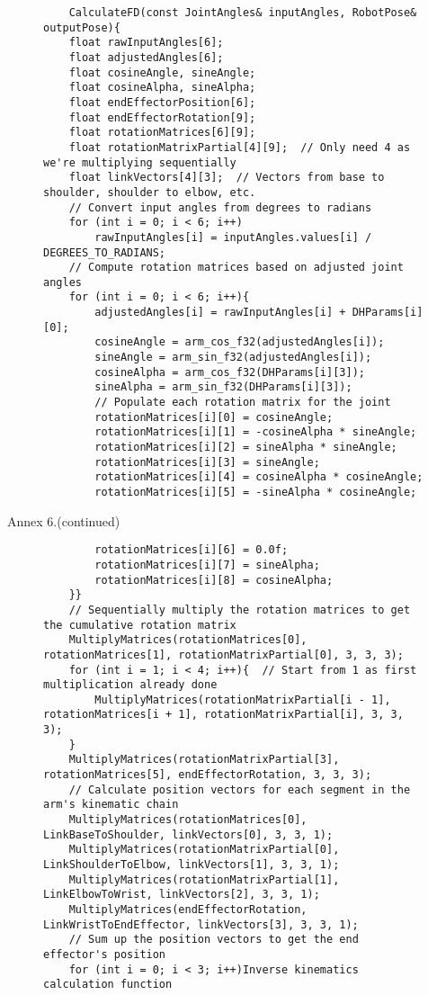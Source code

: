 \newpage
{}


\begin{figure}[H]
	\centering
	\begin{verbatim}
	CalculateFD(const JointAngles& inputAngles, RobotPose& outputPose){
    float rawInputAngles[6];
    float adjustedAngles[6];
    float cosineAngle, sineAngle;
    float cosineAlpha, sineAlpha;
    float endEffectorPosition[6];
    float endEffectorRotation[9];
    float rotationMatrices[6][9];
    float rotationMatrixPartial[4][9];  // Only need 4 as we're multiplying sequentially
    float linkVectors[4][3];  // Vectors from base to shoulder, shoulder to elbow, etc.
    // Convert input angles from degrees to radians
    for (int i = 0; i < 6; i++)
        rawInputAngles[i] = inputAngles.values[i] / DEGREES_TO_RADIANS;
    // Compute rotation matrices based on adjusted joint angles
    for (int i = 0; i < 6; i++){
        adjustedAngles[i] = rawInputAngles[i] + DHParams[i][0];
        cosineAngle = arm_cos_f32(adjustedAngles[i]);
        sineAngle = arm_sin_f32(adjustedAngles[i]);
        cosineAlpha = arm_cos_f32(DHParams[i][3]);
        sineAlpha = arm_sin_f32(DHParams[i][3]);
        // Populate each rotation matrix for the joint
        rotationMatrices[i][0] = cosineAngle;
        rotationMatrices[i][1] = -cosineAlpha * sineAngle;
        rotationMatrices[i][2] = sineAlpha * sineAngle;
        rotationMatrices[i][3] = sineAngle;
        rotationMatrices[i][4] = cosineAlpha * cosineAngle;
        rotationMatrices[i][5] = -sineAlpha * cosineAngle;
	\end{verbatim}
\end{figure}
\newpage
\hfill \large Annex 6.(continued)
\begin{figure}[H]
	\centering
	\begin{verbatim}
		rotationMatrices[i][6] = 0.0f;
        rotationMatrices[i][7] = sineAlpha;
        rotationMatrices[i][8] = cosineAlpha;
    }}
	// Sequentially multiply the rotation matrices to get the cumulative rotation matrix
	MultiplyMatrices(rotationMatrices[0], rotationMatrices[1], rotationMatrixPartial[0], 3, 3, 3);
	for (int i = 1; i < 4; i++){  // Start from 1 as first multiplication already done
		MultiplyMatrices(rotationMatrixPartial[i - 1], rotationMatrices[i + 1], rotationMatrixPartial[i], 3, 3, 3);
	}
	MultiplyMatrices(rotationMatrixPartial[3], rotationMatrices[5], endEffectorRotation, 3, 3, 3);
	// Calculate position vectors for each segment in the arm's kinematic chain
	MultiplyMatrices(rotationMatrices[0], LinkBaseToShoulder, linkVectors[0], 3, 3, 1);
	MultiplyMatrices(rotationMatrixPartial[0], LinkShoulderToElbow, linkVectors[1], 3, 3, 1);
	MultiplyMatrices(rotationMatrixPartial[1], LinkElbowToWrist, linkVectors[2], 3, 3, 1);
	MultiplyMatrices(endEffectorRotation, LinkWristToEndEffector, linkVectors[3], 3, 3, 1);
	// Sum up the position vectors to get the end effector's position
	for (int i = 0; i < 3; i++)Inverse kinematics calculation function
	\end{verbatim}
\end{figure}

